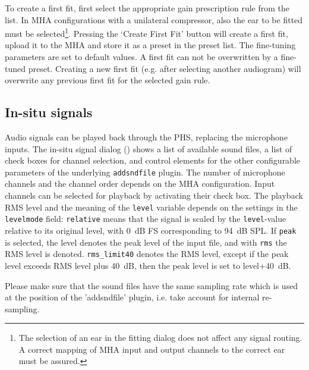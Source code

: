 \documentclass[11pt,a4paper,twoside]{article}
\begin{document}
To create a first fit, first select the appropriate gain prescription
rule from the list. In MHA configurations with a unilateral
compressor, also the ear to be fitted must be selected\footnote{The
  selection of an ear in the fitting dialog does not affect any signal
  routing. A correct mapping of MHA input and output channels to the
  correct ear must be assured.}. Pressing the `Create First Fit'
button will create a first fit, upload it to the MHA and store it as a
preset in the preset list. The fine-tuning parameters are set to
default values.  A first fit can not be overwritten by a fine-tuned
preset.  Creating a new first fit (e.g. after selecting another
audiogram) will overwrite any previous first fit for the selected gain
rule.


\subsection{In-situ signals}\label{sec:insitu}

Audio signals can be played back through the PHS, replacing the
microphone inputs.
%
The in-situ signal dialog ()
shows a list of available sound files, a list of check boxes for
channel selection, and control elements for the other configurable
parameters of the underlying \verb!addsndfile! plugin.
%
The number of microphone channels and the channel order depends on the MHA
configuration.
%
Input channels can be selected for playback by activating their check
box.
%
The playback RMS level and the meaning of the \verb!level! variable
depends on the settings in the \verb!levelmode!  field:
\verb!relative! means that the signal is scaled by the
\verb!level!-value relative to its original level, with 0~dB FS
corresponding to 94~dB SPL. If \verb!peak! is selected, the level
denotes the peak level of the input file, and with \verb!rms! the RMS
level is denoted. \verb!rms_limit40! denotes the RMS level, except if
the peak level exceeds RMS level plus 40~dB, then the peak level is
set to level+40~dB.

Please make sure that the sound files have the same sampling rate
which is used at the position of the 'addsndfile' plugin, i.e. take
account for internal re-sampling.

\end{document}
